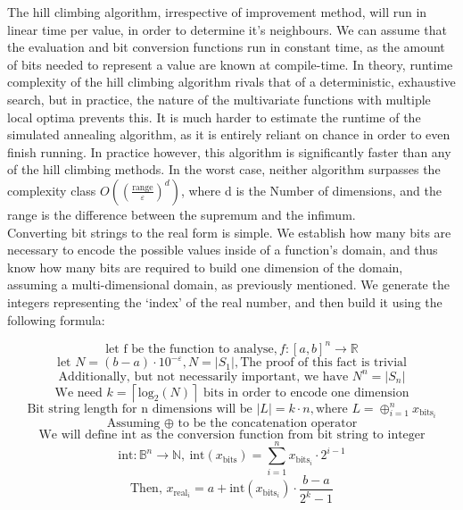 \documentclass{article}
\begin{document}
The hill climbing algorithm, irrespective of improvement method, will run in linear time per value, in order to determine it's neighbours. We can assume that the evaluation and bit conversion functions run in constant time, as the amount of bits needed to represent a value are known at compile-time. In theory, runtime complexity of the hill climbing algorithm rivals that of a deterministic, exhaustive search, but in practice, the nature of the multivariate functions with multiple local optima prevents this. 
It is much harder to estimate the runtime of the simulated annealing algorithm, as it is entirely reliant on chance in order to even finish running. In practice however, this algorithm is significantly faster than any of the hill climbing methods.
In the worst case, neither algorithm surpasses the complexity class $O\left(\left(\frac{\text{range}}{\varepsilon}\right)^d\right)$, where d is the Number of dimensions, and the range is the difference between the supremum and the infimum. \\
Converting bit strings to the real form is simple. We establish how many bits are necessary to encode the possible values inside of a function's domain, and thus know how many bits are required to build one dimension of the domain, assuming a multi-dimensional domain, as previously mentioned. We generate the integers representing the `index' of the real number, and then build it using the following formula\cite{GA}:

$$ \text{let f be the function to analyse}, f \colon [a, b]^n \to \mathbb{R} $$
$$ \text{let } N = (b - a) \cdot 10^{-\varepsilon}, N = |S_1|, \text{The proof of this fact is trivial} $$
$$ \text{Additionally, but not necessarily important, we have } {N}^n = |S_n| $$
$$ \text{We need } k = \left\lceil \text{log}_2(N)\right\rceil \text{ bits in order to encode one dimension} $$
$$ \text{Bit string length for n dimensions will be } |L| = k \cdot n, \text{where } L = \oplus_{i = 1}^n x_{\text{bits}_i} $$
$$ \text{Assuming } \oplus \text{ to be the concatenation operator}$$
$$ \text{We will define int as the conversion function from bit string to integer} $$
$$ \text{int} \colon \mathbb{B}^n \to \mathbb{N}, \ 
\text{int}(x_\text{bits}) = \sum_{i = 1}^n x_{\text{bits}_i} \cdot 2^{i - 1} $$
$$ \text{Then, } x_{\text{real}_i} = a + \text{int}\left(x_{\text{bits}_i}\right) \cdot \frac{b - a}{2^k - 1} $$
\end{document}
